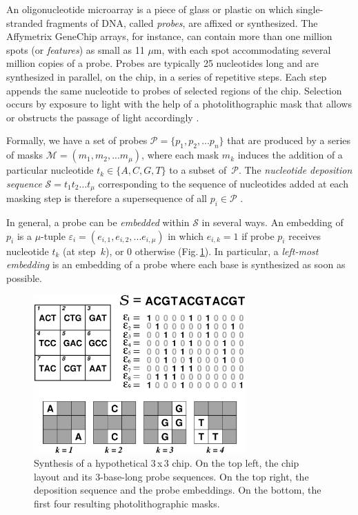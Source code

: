 \documentclass{llncs}
\begin{document}
An oligonucleotide microarray is a piece of glass or plastic on which
single-stranded fragments of DNA, called \emph{probes}, are affixed or
synthesized. The Affymetrix GeneChip\raisebox{.6ex}{\scriptsize \textregistered}
arrays, for instance, can contain
more than one million spots (or \emph{features}) as small as 11 $\mu$m,
with each spot accommodating several million copies of a probe. Probes
are typically 25 nucleotides long and are synthesized in parallel, on
the chip, in a series of repetitive steps. Each step appends the same
nucleotide to probes of selected regions of the chip. Selection occurs
by exposure to light with the help of a photolithographic mask that
allows or obstructs the passage of light accordingly \cite{FODOR91}.

Formally, we have a set of probes $\mathcal{P} = \{p_{1}, p_{2}, ... p_{n}\}$
that are produced by a series of masks $\mathcal{M} = (m_{1}, m_{2}, ... m_{\mu})$,
where each mask $m_{k}$ induces the addition of a particular nucleotide
$t_{k} \in \{A, C, G, T\}$ to a subset of~$\mathcal{P}$. The \emph{nucleotide
deposition sequence} $\mathcal{S} = t_{1} t_{2} \ldots t_{\mu}$ corresponding
to the sequence of nucleotides added at each masking step is therefore a
supersequence of all $p_{i} \in \mathcal{P}$ \cite{RAHMANN03}.

In general, a probe can be \emph{embedded} within $\mathcal{S}$ in several
ways. An embedding of $p_{i}$ is a $\mu$-tuple
$\varepsilon_{i} = (e_{i,1}, e_{i,2}, ... e_{i,\mu})$ in which $e_{i,k} = 1$
if probe $p_{i}$ receives nucleotide $t_{k}$ (at step~$k$), or 0 otherwise
(Fig.\,\ref{fig:masking_process}). In particular, a \emph{left-most embedding}
is an embedding of a probe where each base is synthesized as soon as possible.

\begin{figure}
\centerline{\includegraphics[width=230pt]{chip}}
\caption{Synthesis of a hypothetical 3\,x\,3 chip. On the top left, the chip layout and its 3-base-long probe sequences. On the top right, the deposition sequence and the probe embeddings. On the bottom, the first four resulting photolithographic masks.}
\label{fig:masking_process}
\end{figure}
\end{document}
